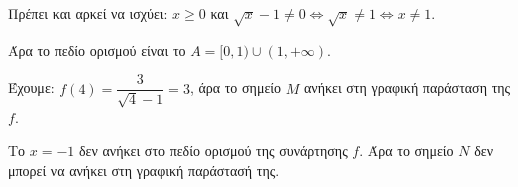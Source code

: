 
\begin{alist}
\item Πρέπει και αρκεί να ισχύει: $x \ge 0$ και $\sqrt{x} - 1 \ne 0 \Leftrightarrow \sqrt{x} \ne 1 \Leftrightarrow x \ne 1$.

Άρα το πεδίο ορισμού είναι το $A = [0, 1) \cup (1, +\infty)$.

\item Έχουμε: $f(4) = \dfrac{3}{\sqrt{4}-1} = 3$, άρα το σημείο $M$ ανήκει στη γραφική παράσταση της $f$.

\item Το $x = -1$ δεν ανήκει στο πεδίο ορισμού της συνάρτησης $f$. Άρα το σημείο $N$ δεν μπορεί να ανήκει στη γραφική παράστασή της.
\end{alist}

